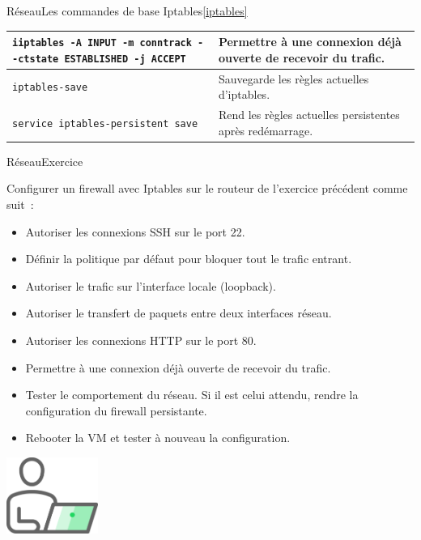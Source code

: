 \documentclass{beamer}
\begin{document}
\begin{frame}{Réseau}{Les commandes de base Iptables\cref{iptables}}
\begin{tiny}
\begin{table}[ht]
\begin{tabular}{|p{8cm}|p{3.5cm}|}
                    \hline
                    \lstinline{iiptables -A INPUT -m conntrack --ctstate ESTABLISHED -j ACCEPT}    & Permettre à une connexion déjà ouverte de recevoir du trafic.        \\
                    \hline
                    \lstinline{iptables-save}                                                      & Sauvegarde les règles actuelles d'iptables.                          \\
                    \hline
                    \lstinline{service iptables-persistent save}                                   & Rend les règles actuelles persistentes après redémarrage.            \\
                    \hline
                \end{tabular}
            \end{table}
        \end{tiny}
    \end{frame}

    \begin{frame}{Réseau}{Exercice \execcounterdispinc}
        \begin{footnotesize}
            Configurer un firewall avec Iptables sur le routeur de l'exercice précédent comme suit~:
            \begin{itemize}
                \item Autoriser les connexions SSH sur le port 22.
                \item Définir la politique par défaut pour bloquer tout le trafic entrant.
                \item Autoriser le trafic sur l'interface locale (loopback).
                \item Autoriser le transfert de paquets entre deux interfaces réseau.
                \item Autoriser les connexions HTTP sur le port 80.
                \item Permettre à une connexion déjà ouverte de recevoir du trafic.
                \item Tester le comportement du réseau.
                Si il est celui attendu, rendre la configuration du firewall persistante.
                \item Rebooter la VM et tester à nouveau la configuration.
            \end{itemize}
        \end{footnotesize}
        \begin{center}
            \includegraphics[width=3cm]{image/guy-in-front-of-desktop}
        \end{center}
    \end{frame}
\end{document}
